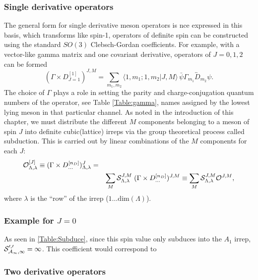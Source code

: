 \begin{table}
\subsubsection{Single derivative operators}
The general form for single derivative meson operators is \cite{Dudek_2010} 
nce expressed in this basis, which transforms like spin-1, operators of definite spin can be constructed using the standard $SO(3)$ Clebsch-Gordan coefficients. For example, with a vector-like gamma matrix and one covariant derivative, operators of $J=0,1,2$ can be formed
\begin{equation}
 (\Gamma \times D^{[1]}_{J=1} )^{J, M} = \sum_{m_1, m_2}\big\langle 1, m_1 ; 1, m_2 \big| J, M
  \big\rangle\,  \bar{\psi} \Gamma_{m_1}
  \overleftrightarrow{D}_{m_2} \psi. \nonumber
\end{equation}
The choice of $\Gamma$ plays a role in setting the parity and charge-conjugation quantum numbers of the operator, see Table \ref{Table:gamma}, names assigned by the lowest lying meson in that particular channel. As noted in the introduction of this chapter, we must distribute the different $M$ components belonging to a meson of spin $J$ into definite cubic(lattice) irreps via the group theoretical process called subduction. This is carried out by linear combinations of the $M$ components for each $J$\cite{Dudek_2010}:
\begin{eqnarray}
{\cal O}^{[J]}_{\Lambda,\lambda} \equiv (\Gamma \times D^{[n_D]}_{\ldots})^J_{\Lambda, \lambda} =  \nonumber\\
& & \sum_M {\cal
     S}^{J,M}_{\Lambda, \lambda}   \; (\Gamma \times
   D^{[n_D]}_{\ldots})^{J,M} \equiv \sum_M {\cal S}^{J,M}_{\Lambda,\lambda} {\cal O}^{J,M}, \nonumber
\end{eqnarray}
where $\lambda$ is the ``row'' of the irrep ($1\ldots\mathrm{dim}(\Lambda)$). 

\subsubsection{Example for $J=0$}
As seen in \ref{Table:Subduce}, since this spin value only subduces into the $A_1$ irrep, $\cal{S}_{A_1,1}^{0,0} = 1$. This coefficient would correspond to 


\subsubsection{Two derivative operators}


\end{table}
